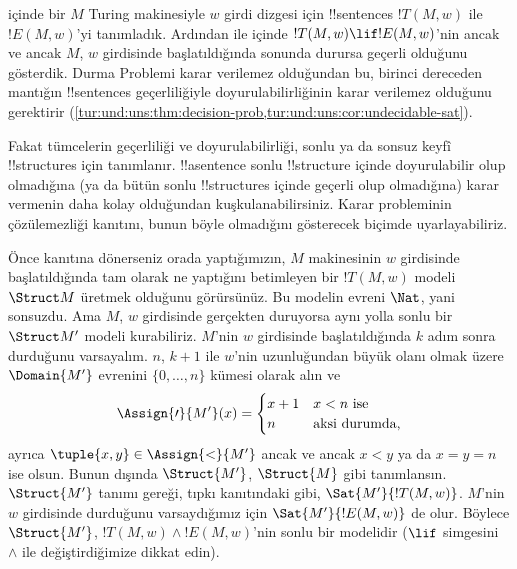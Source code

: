 \documentclass[../../../include/open-logic-section]{subfiles}
\begin{document}

\begin{explain}
   içinde bir $M$ Turing makinesiyle $w$ girdi dizgesi için
  !!{sentence}s $!T(M,w)$ ile $!E(M,w)$'yi tanımladık. Ardından
   ile  içinde
  $!T(M,w)\lif !E(M,w)$'nin ancak ve ancak $M$, $w$ girdisinde
  başlatıldığında sonunda durursa geçerli olduğunu gösterdik. Durma Problemi
  karar verilemez olduğundan bu, birinci dereceden mantığın !!{sentence}s
  geçerliliğiyle doyurulabilirliğinin karar verilemez olduğunu gerektirir
  (\cref{tur:und:uns:thm:decision-prob,tur:und:uns:cor:undecidable-sat}).

  Fakat tümcelerin geçerliliği ve doyurulabilirliği, sonlu ya da sonsuz keyfî
  !!{structure}s için tanımlanır. !!a{sentence} sonlu !!{structure} içinde
  doyurulabilir olup olmadığına (ya da bütün sonlu !!{structure}s içinde
  geçerli olup olmadığına) karar vermenin daha kolay olduğundan
  kuşkulanabilirsiniz. Karar probleminin çözülemezliği kanıtını, bunun böyle
  olmadığını gösterecek biçimde uyarlayabiliriz.

  Önce  kanıtına dönerseniz orada yaptığımızın,
  $M$ makinesinin $w$ girdisinde başlatıldığında tam olarak ne yaptığını
  betimleyen bir $!T(M,w)$ modeli~$\Struct M$ üretmek olduğunu görürsünüz. Bu
  modelin evreni $\Nat$, yani sonsuzdu. Ama $M$, $w$ girdisinde gerçekten
  duruyorsa aynı yolla sonlu bir $\Struct M'$ modeli kurabiliriz. $M$'nin
  $w$ girdisinde başlatıldığında $k$ adım sonra durduğunu varsayalım.
  $n$, $k+1$ ile $w$'nin uzunluğundan büyük olanı olmak üzere
  $\Domain{M'}$ evrenini $\{0,\dots,n\}$ kümesi olarak alın ve
  \[
    \Assign{\prime}{M'}(x) = 
    \begin{cases}
      x + 1 &\text{$x < n$ ise}\\
      n &\text{aksi durumda,}
    \end{cases}
  \]
  ayrıca $\tuple{x,y}\in\Assign{<}{M'}$ ancak ve ancak $x<y$ ya da
  $x=y=n$ ise olsun. Bunun dışında $\Struct{M'}$, $\Struct{M}$ gibi
  tanımlansın. $\Struct{M'}$ tanımı gereği, tıpkı
   kanıtındaki gibi,
  $\Sat{M'}{!T(M,w)}$. $M$'nin $w$ girdisinde durduğunu varsaydığımız için
  $\Sat{M'}{!E(M,w)}$ de olur. Böylece $\Struct{M'}$,
  $!T(M,w)\land !E(M,w)$'nin sonlu bir modelidir ($\lif$ simgesini $\land$
  ile değiştirdiğimize dikkat edin).
  

\end{explain}
\end{document}
